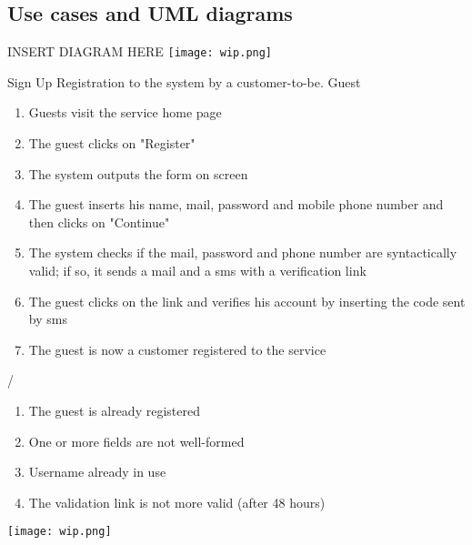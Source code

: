 
\pagebreak
\subsection{Use cases and UML diagrams}
INSERT DIAGRAM HERE
\texttt{[image: wip.png]}
\pagebreak

\usecase
{Sign Up}
{Registration to the system by a customer-to-be.}
{Guest}
{
\begin{enumerate}
	\item Guests visit the service home page
	\item The guest clicks on "Register"
	\item The system outputs the form on screen
	\item The guest inserts his name, mail, password and mobile phone number and then clicks on "Continue"
	\item The system checks if the mail, password and phone number are syntactically valid; if so, it sends a mail and a sms with a verification link
	\item The guest clicks on the link and verifies his account by inserting the code sent by sms
	\item The guest is now a customer registered to the service
\end{enumerate}
}
{
/
}
{ 
\begin{enumerate}
	\item The guest is already registered
	\item One or more fields are not well-formed
	\item Username already in use
    \item The validation link is not more valid (after 48 hours)
\end{enumerate}
}

\pagebreak
\texttt{[image: wip.png]}

